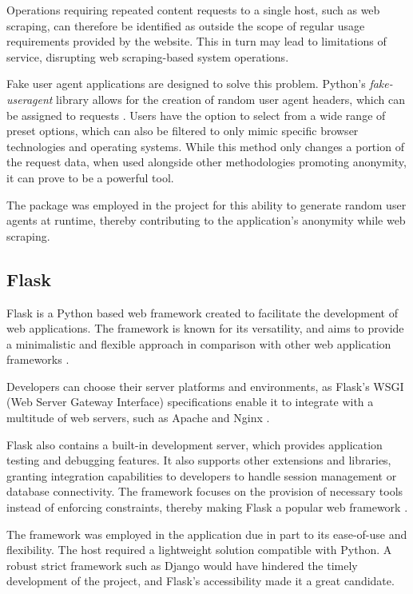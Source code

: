 \documentclass{thesis-ekf}
\theoremstyle{definition}
\theoremstyle{remark}
\begin{document}
{Operations requiring repeated content requests to a single host, such as web scraping, can therefore be identified as outside the scope of regular usage requirements provided by the website. This in turn may lead to limitations of service, disrupting web scraping-based system operations.

Fake user agent applications are designed to solve this problem. Python's \emph{fake-useragent} library allows for the creation of random user agent headers, which can be assigned to requests \cite{fake-useragent}. Users have the option to select from a wide range of preset options, which can also be filtered to only mimic specific browser technologies and operating systems. While this method only changes a portion of the request data, when used alongside other methodologies promoting anonymity, it can prove to be a powerful tool.

The package was employed in the project for this ability to generate random user agents at runtime, thereby contributing to the application's anonymity while web scraping.

\subsection{Flask}
Flask is a Python based web framework created to facilitate the development of web applications. The framework is known for its versatility, and aims to provide a minimalistic and flexible approach in comparison with other web application frameworks \cite{docs-flask}. 

Developers can choose their server platforms and environments, as Flask's WSGI (Web Server Gateway Interface) specifications enable it to integrate with a multitude of web servers, such as Apache and Nginx \cite{flask}.

Flask also contains a built-in development server, which provides application testing and debugging features. It also supports other extensions and libraries, granting integration capabilities to developers to handle session management or database connectivity. The framework focuses on the provision of necessary tools instead of enforcing constraints, thereby making Flask a popular web framework \cite{flask}.

The framework was employed in the application due in part to its ease-of-use and flexibility. The host required a lightweight solution compatible with Python. A robust strict framework such as Django would have hindered the timely development of the project, and Flask's accessibility made it a great candidate.   

}
\end{document}
